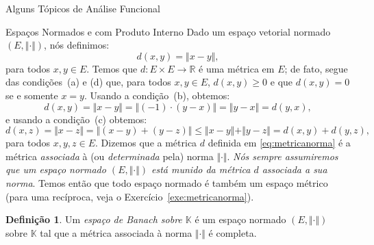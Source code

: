 \documentclass[oneside,final,11pt]{amsbook}
\newcommand{\R}{\mathds R}
\newcommand{\K}{\mathds K}
\theoremstyle{remark}\newtheorem{exercise}{Exercício}[chapter]
\theoremstyle{remark}\newtheorem{*exercise}[exercise]{\hbox to 0pt{\hskip 0pt minus 1fil*}Exercício}
\theoremstyle{definition}\newtheorem{exdefin}{Definição}[chapter]
\theoremstyle{plain}\newtheorem{teo}{Teorema}[section]
\theoremstyle{plain}\newtheorem{lem}[teo]{Lema}
\theoremstyle{plain}\newtheorem{prop}[teo]{Proposição}
\theoremstyle{plain}\newtheorem{cor}[teo]{Corolário}
\theoremstyle{definition}\newtheorem{defin}[teo]{Definição}
\theoremstyle{remark}\newtheorem{rem}[teo]{Observação}
\theoremstyle{definition}\newtheorem{notation}[teo]{Notação}
\theoremstyle{definition}\newtheorem{convention}[teo]{Convenção}
\theoremstyle{definition}\newtheorem{example}[teo]{Exemplo}
\numberwithin{section}{chapter}
\numberwithin{equation}{section}
\begin{document}
\begin{chapter}{Alguns Tópicos de Análise Funcional}
\begin{section}{Espaços Normados e com Produto Interno}
Dado um espaço vetorial normado $(E,\Vert\cdot\Vert)$, nós definimos:
\begin{equation}\label{eq:metricanorma}
d(x,y)=\Vert x-y\Vert,
\end{equation}
para todos $x,y\in E$. Temos que $d:E\times E\to\R$ é uma métrica em $E$; de fato, segue das condições~(a)
e (d) que, para todos $x,y\in E$, $d(x,y)\ge0$ e que $d(x,y)=0$ se e somente $x=y$. Usando a condição~(b), obtemos:
\[d(x,y)=\Vert x-y\Vert=\big\Vert(-1)\cdot(y-x)\big\Vert=\Vert y-x\Vert=d(y,x),\]
e usando a condição~(c) obtemos:
\[d(x,z)=\Vert x-z\Vert=\big\Vert(x-y)+(y-z)\big\Vert\le\Vert x-y\Vert+\Vert y-z\Vert=d(x,y)+d(y,z),\]
para todos $x,y,z\in E$. Dizemos que a métrica $d$ definida em \eqref{eq:metricanorma} é a métrica
{\em associada\/} à (ou {\em determinada} pela) norma $\Vert\cdot\Vert$.
{\em Nós sempre assumiremos que um espaço normado $(E,\Vert\cdot\Vert)$ está munido da métrica $d$ associada a sua norma}.
Temos então que todo espaço normado é também um espaço métrico (para uma recíproca, veja
o Exercício~\ref{exe:metricanorma}).

\begin{defin}
Um {\em espaço de Banach sobre $\K$\/} é um espaço normado
$(E,\Vert\cdot\Vert)$ sobre $\K$ tal que a métrica associada à norma $\Vert\cdot\Vert$ é completa.
\end{defin}


\end{section}
\end{chapter}
\end{document}
